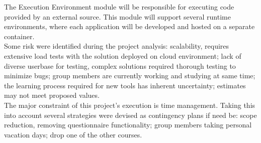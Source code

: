 The Execution Environment module will be responsible for executing code provided by an external source. This module will support several runtime environments, where each application will be developed and hosted on a separate container.
\\[2ex]
Some risk were identified during the project analysis: scalability, requires extensive load tests with the solution deployed on cloud environment; lack of diverse userbase for testing, complex solutions required thorough testing to minimize bugs; group members are currently working and studying at same time; the learning process required for new tools has inherent uncertainty; estimates may not meet proposed values.
\\
The major constraint of this project's execution is time management. Taking this into account several strategies were devised as contingency plans if need be: scope reduction, removing questionnaire functionality; group members taking personal vacation days; drop one of the other courses.
